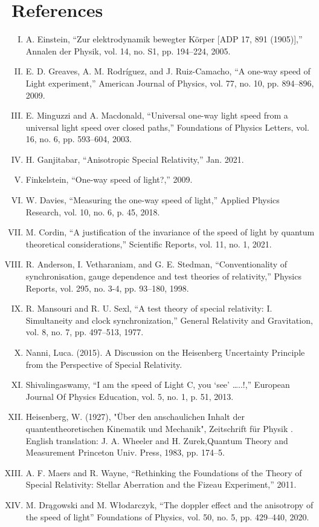\documentclass[12pt,letterpaper]{article}
\begin{document}
\section{References}
\begin{enumerate}[I.]
\item A. Einstein, “Zur elektrodynamik bewegter Körper [ADP 17, 891 (1905)],” Annalen der Physik, vol. 14, no. S1, pp. 194–224, 2005. 

\item E. D. Greaves, A. M. Rodríguez, and J. Ruiz-Camacho, “A one-way speed of Light experiment,” American Journal of Physics, vol. 77, no. 10, pp. 894–896, 2009. 
\item E. Minguzzi and A. Macdonald, “Universal one-way light speed from a universal light speed over closed paths,” Foundations of Physics Letters, vol. 16, no. 6, pp. 593–604, 2003. 
\item H. Ganjitabar, “Anisotropic Special Relativity,” Jan. 2021. 
\item Finkelstein, “One-way speed of light?,” 2009. 
\item W. Davies, “Measuring the one-way speed of light,” Applied Physics Research, vol. 10, no. 6, p. 45, 2018. 
\item M. Cordin, “A justification of the invariance of the speed of light by quantum theoretical considerations,” Scientific Reports, vol. 11, no. 1, 2021. 
\item R. Anderson, I. Vetharaniam, and G. E. Stedman, “Conventionality of synchronisation, gauge dependence and test theories of relativity,” Physics Reports, vol. 295, no. 3-4, pp. 93–180, 1998. 
\item R. Mansouri and R. U. Sexl, “A test theory of special relativity: I. Simultaneity and clock synchronization,” General Relativity and Gravitation, vol. 8, no. 7, pp. 497–513, 1977. 
\item Nanni, Luca. (2015). A Discussion on the Heisenberg Uncertainty Principle from the Perspective of Special Relativity. 
\item Shivalingaswamy, “I am the speed of Light C, you ‘see’ …..!,” European Journal Of Physics Education, vol. 5, no. 1, p. 51, 2013. 
\item Heisenberg, W. (1927), "Über den anschaulichen Inhalt der quantentheoretischen Kinematik und Mechanik", Zeitschrift für Physik . English translation: J. A. Wheeler and H. Zurek,Quantum Theory and Measurement Princeton Univ. Press, 1983, pp. 174–5.
\item A. F. Maers and R. Wayne, “Rethinking the Foundations of the Theory of Special Relativity: Stellar Aberration and the Fizeau Experiment,” 2011. 
\item M. Drągowski and M. Włodarczyk, “The doppler effect and the anisotropy of the speed of light” Foundations of Physics, vol. 50, no. 5, pp. 429–440, 2020. 
\end{enumerate}
\end{document}
